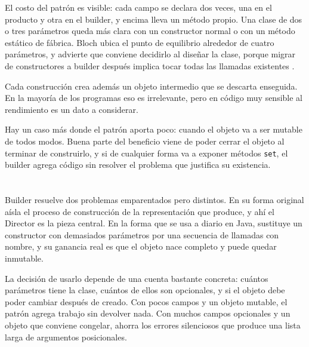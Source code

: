 \documentclass[10pt,a4paper]{article}
\begin{document}
El costo del patrón es visible: cada campo se declara dos veces, una en el producto y otra en el builder, y encima lleva un método propio. Una clase de dos o tres parámetros queda más clara con un constructor normal o con un método estático de fábrica. Bloch ubica el punto de equilibrio alrededor de cuatro parámetros, y advierte que conviene decidirlo al diseñar la clase, porque migrar de constructores a builder después implica tocar todas las llamadas existentes \cite{bloch2018}.

Cada construcción crea además un objeto intermedio que se descarta enseguida. En la mayoría de los programas eso es irrelevante, pero en código muy sensible al rendimiento es un dato a considerar.

Hay un caso más donde el patrón aporta poco: cuando el objeto va a ser mutable de todos modos. Buena parte del beneficio viene de poder cerrar el objeto al terminar de construirlo, y si de cualquier forma va a exponer métodos \texttt{set}, el builder agrega código sin resolver el problema que justifica su existencia.

\section{\color{colorIPN}{Conclusión}}

Builder resuelve dos problemas emparentados pero distintos. En su forma original aísla el proceso de construcción de la representación que produce, y ahí el Director es la pieza central. En la forma que se usa a diario en Java, sustituye un constructor con demasiados parámetros por una secuencia de llamadas con nombre, y su ganancia real es que el objeto nace completo y puede quedar inmutable.

La decisión de usarlo depende de una cuenta bastante concreta: cuántos parámetros tiene la clase, cuántos de ellos son opcionales, y si el objeto debe poder cambiar después de creado. Con pocos campos y un objeto mutable, el patrón agrega trabajo sin devolver nada. Con muchos campos opcionales y un objeto que conviene congelar, ahorra los errores silenciosos que produce una lista larga de argumentos posicionales.


\pagebreak

\section{\color{colorIPN}{Referencias Bibliográficas}}
\nocite{*}
\color{colorESCOM}{
	\printbibliography[heading=none]
}
\end{document}
